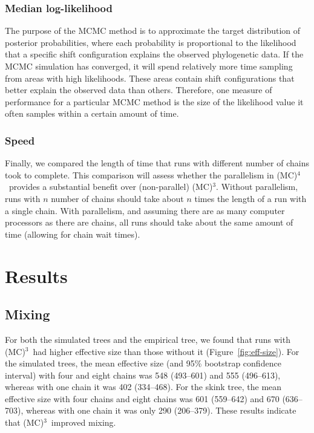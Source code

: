 \documentclass[12pt]{article}
\newcommand{\MCMCMC}{(MC)$^{3}$}
\newcommand{\MCMCMCMC}{(MC)$^{4}$}
\begin{document}
\subsubsection*{Median log-likelihood}

The purpose of the MCMC method is to approximate
the target distribution of posterior probabilities,
where each probability is proportional
to the likelihood that a specific shift configuration
explains the observed phylogenetic data.
%
If the MCMC simulation has converged,
it will spend relatively more time sampling
from areas with high likelihoods.
%
These areas contain shift configurations
that better explain the observed data than others.
%
Therefore, one measure of performance for a particular MCMC method
is the size of the likelihood value it often samples
within a certain amount of time.


\subsubsection*{Speed}

Finally, we compared the length of time that runs
with different number of chains took to complete.
%
This comparison will assess whether the parallelism in \MCMCMCMC\ 
provides a substantial benefit over (non-parallel) \MCMCMC.
%
Without parallelism, runs with $n$ number of chains
should take about $n$ times the length of a run with a single chain.
%
With parallelism, and assuming there are as many computer processors
as there are chains, all runs should take about the same amount of time
(allowing for chain wait times).


\section*{Results}

\subsection*{Mixing}

For both the simulated trees and the empirical tree,
we found that runs with \MCMCMC\ had higher effective size
than those without it (Figure~\ref{fig:eff-size}).
%
For the simulated trees,
the mean effective size (and 95\% bootstrap confidence interval)
with four and eight chains was 548 (493--601) and 555 (496--613),
whereas with one chain it was 402 (334--468).
%
For the skink tree, the mean effective size
with four chains and eight chains was 601 (559--642) and 670 (636--703),
whereas with one chain it was only 290 (206--379).
%
These results indicate that \MCMCMC\ improved mixing.
\end{document}
